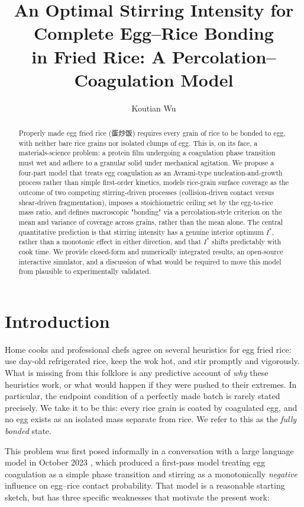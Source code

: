 \documentclass[11pt]{article}
\title{An Optimal Stirring Intensity for Complete Egg--Rice Bonding\\ in Fried Rice: A Percolation--Coagulation Model}
\author[1]{Koutian Wu}
\affil[1]{Independent Research (GitHub: \href{https://github.com/ktwu01}{ktwu01})}
\date{}
\begin{document}
\maketitle

\begin{abstract}
Properly made egg fried rice (蛋炒饭) requires every grain of rice to be bonded to egg, with neither bare rice grains nor isolated clumps of egg. This is, on its face, a materials-science problem: a protein film undergoing a coagulation phase transition must wet and adhere to a granular solid under mechanical agitation. We propose a four-part model that treats egg coagulation as an Avrami-type nucleation-and-growth process rather than simple first-order kinetics, models rice-grain surface coverage as the outcome of two competing stirring-driven processes (collision-driven contact versus shear-driven fragmentation), imposes a stoichiometric ceiling set by the egg-to-rice mass ratio, and defines macroscopic "bonding" via a percolation-style criterion on the mean and variance of coverage across grains, rather than the mean alone. The central quantitative prediction is that stirring intensity has a genuine interior optimum $I^*$, rather than a monotonic effect in either direction, and that $I^*$ shifts predictably with cook time. We provide closed-form and numerically integrated results, an open-source interactive simulator, and a discussion of what would be required to move this model from plausible to experimentally validated.
\end{abstract}

\section{Introduction}

Home cooks and professional chefs agree on several heuristics for egg fried rice: use day-old refrigerated rice, keep the wok hot, and stir promptly and vigorously. What is missing from this folklore is any predictive account of \emph{why} these heuristics work, or what would happen if they were pushed to their extremes. In particular, the endpoint condition of a perfectly made batch is rarely stated precisely. We take it to be this: every rice grain is coated by coagulated egg, and no egg exists as an isolated mass separate from rice. We refer to this as the \emph{fully bonded} state.

This problem was first posed informally in a conversation with a large language model in October 2023 \cite{gfr2023}, which produced a first-pass model treating egg coagulation as a simple phase transition and stirring as a monotonically \emph{negative} influence on egg--rice contact probability. That model is a reasonable starting sketch, but has three specific weaknesses that motivate the present work:
\end{document}
